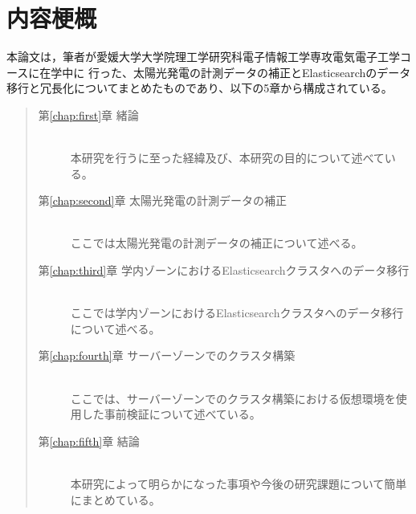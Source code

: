 \chapter*{内容梗概}

本論文は，筆者が愛媛大学大学院理工学研究科電子情報工学専攻電気電子工学コースに在学中に
行った、太陽光発電の計測データの補正とElasticsearchのデータ移行と冗長化についてまとめたものであり、以下の5章から構成されている。\\

\begin{quote}
      \begin{description}

            \item[第\ref{chap:first}章 緒論]\ \\
            本研究を行うに至った経緯及び、本研究の目的について述べている。
            \vspace{3.0mm}
            
            \item[第\ref{chap:second}章 太陽光発電の計測データの補正]\ \\
            ここでは太陽光発電の計測データの補正について述べる。
            \vspace{3.0mm}
            
            \item[第\ref{chap:third}章 学内ゾーンにおけるElasticsearchクラスタへのデータ移行]\ \\
            ここでは学内ゾーンにおけるElasticsearchクラスタへのデータ移行について述べる。
            \vspace{3.0mm}
            
            \item[第\ref{chap:fourth}章 サーバーゾーンでのクラスタ構築]\ \\
            ここでは、サーバーゾーンでのクラスタ構築における仮想環境を使用した事前検証について述べている。
            \vspace{3.0mm}
            
            \item[第\ref{chap:fifth}章 結論]\ \\
            本研究によって明らかになった事項や今後の研究課題について簡単にまとめている。
      \end{description}
\end{quote}

